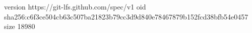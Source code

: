 version https://git-lfs.github.com/spec/v1
oid sha256:c6f3ce504cb63c507ba21823b79cc3d9d840e78467879b152fcd38bfb54e0457
size 18980
